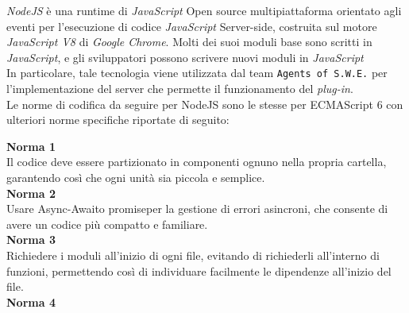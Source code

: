 \textit{NodeJS} è una runtime di \textit{JavaScript} Open source multipiattaforma orientato agli eventi per l'esecuzione di codice \textit{JavaScript} Server-side, costruita sul motore \textit{JavaScript V8} di \textit{Google Chrome}. Molti dei suoi moduli base sono scritti in \textit{JavaScript}, e gli sviluppatori possono scrivere nuovi moduli in \textit{JavaScript}\\
In particolare, tale tecnologia viene utilizzata dal team \texttt{Agents of S.W.E.} per l'implementazione del server che permette il funzionamento del \textit{plug-in}. \\
Le norme di codifica da seguire per NodeJS sono le stesse per ECMAScript 6 con ulteriori norme specifiche riportate di seguito:

\textbf{Norma 1} \\
Il codice deve essere partizionato in componenti ognuno nella propria cartella, garantendo così che ogni unità sia piccola e semplice. 
\-\\

\textbf{Norma 2} \\
Usare Async-Await\glossario o promise\glossario per la gestione di errori asincroni, che consente di avere un codice più compatto e familiare.
\-\\

\textbf{Norma 3} \\
Richiedere i moduli all'inizio di ogni file, evitando di richiederli all'interno di funzioni, permettendo così di individuare facilmente le dipendenze all'inizio del file.
\-\\

\textbf{Norma 4} \\
